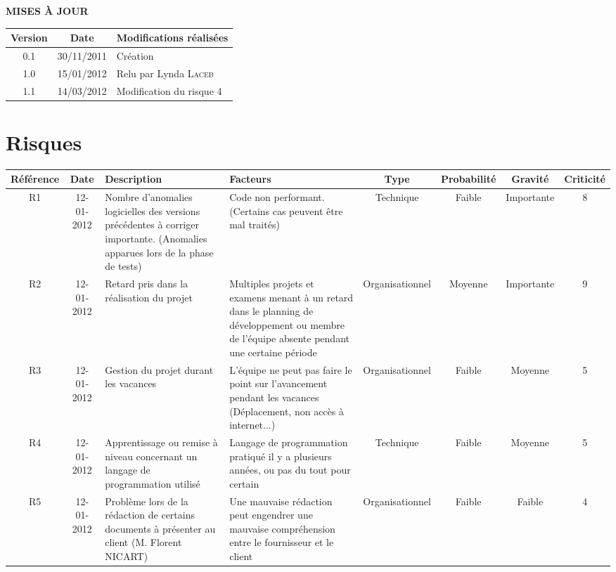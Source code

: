 \documentclass[a4paper,11pt,french]{article}
\begin{document}
\makeFirstPage
\clearpage
\vspace*{1cm}
\begin{center}
\textbf{\huge{MISES À JOUR}}\\
\vspace*{3cm}
	\begin{tabularx}{16cm}{|c|c|X|}
	\hline
	\bfseries{Version} & \bfseries{Date} & \bfseries{Modifications
réalisées}\\
	\hline
	0.1 & 30/11/2011 & Création\\
	\hline
	1.0 &  15/01/2012 & Relu par Lynda \textsc{Laceb} \\
	\hline
	1.1 &  14/03/2012 & Modification du risque 4\\
	\hline
	\end{tabularx}
\end{center}

\clearpage

\section{Risques}
\begin{flushleft}
\begin{small} 
\begin{tabularx}{18cm}{|c|c|p{2.28cm}|p{2cm}|c|c|c|c|}
\hline
Référence & Date & Description & Facteurs & Type & Probabilité & Gravité &
Criticité \\
\hline
R1 & 12-01-2012 & 
Nombre d'anomalies logicielles des versions précédentes
à corriger importante. (Anomalies apparues lors de la phase de tests)
& Code non performant. (Certains cas peuvent être mal traités)
& Technique & Faible & Importante & 8 \\
\hline
R2 & 12-01-2012 &
Retard pris dans la réalisation du projet
& Multiples projets et examens menant à un retard dans le planning de
développement ou membre de l’équipe absente pendant une certaine période
& Organisationnel & Moyenne & Importante & 9 \\
\hline
R3 & 12-01-2012 &
Gestion du projet durant les vacances 
& L'équipe ne peut pas faire le point sur l'avancement
pendant les vacances (Déplacement, non accès à internet...)
& Organisationnel & Faible & Moyenne & 5 \\
\hline
R4 & 12-01-2012 & 
Apprentissage ou remise à niveau concernant un langage de
programmation utilisé
& Langage de programmation pratiqué il y a plusieurs années, ou pas du tout pour
certain
& Technique & Faible & Moyenne & 5 \\
\hline
R5 & 12-01-2012 & Problème lors de la rédaction de certains documents à
présenter au client (M. Florent NICART)
& Une mauvaise rédaction peut engendrer une mauvaise compréhension entre le
fournisseur et le client
& Organisationnel & Faible & Faible & 4 \\
\hline
\end{tabularx}

\end{small}
\end{flushleft}
\end{document}
